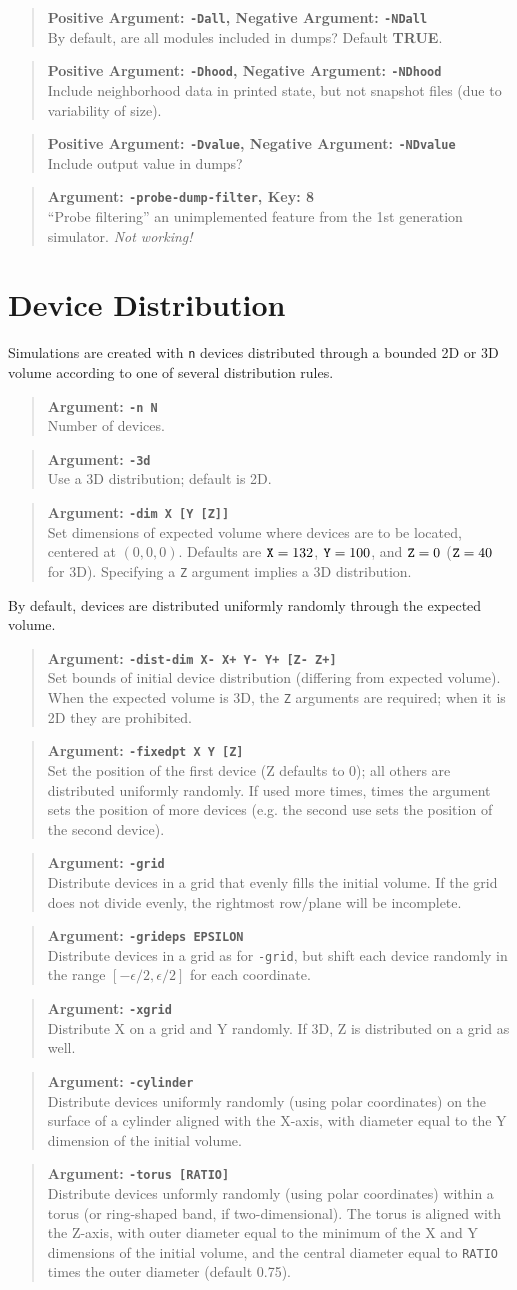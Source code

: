 \documentclass{article}
\newcommand\broken{{\em Not working!}}
\newcommand\true{{\bf TRUE}}
\newcommand\var[1]{{\tt #1}}
\newcommand\key[1]{{\bf #1}}
\newcommand\simarg[2]{\begin{quote} {\bf Argument: \var{#1}} \\ #2 \end{quote}}
\newcommand\simargkey[3]{
  \begin{quote} {\bf Argument: \var{#1}, Key: \key{#2}} \\ #3 \end{quote}
}
\newcommand\simPMarg[3]{
  \begin{quote}
    {\bf Positive Argument: \var{#1}, Negative Argument: \var{#2}} \\ #3
  \end{quote}
}
\begin{document}
\simPMarg{-Dall}{-NDall}{By default, are all modules included in dumps?
  Default \true{}.}
\simPMarg{-Dhood}{-NDhood}{Include neighborhood data in printed state, 
  but not snapshot files (due to variability of size).}
\simPMarg{-Dvalue}{-NDvalue}{Include output value in dumps?}

\simargkey{-probe-dump-filter}{8}{``Probe filtering'' an unimplemented feature
  from the 1st generation simulator. \broken{}}


\section{Device Distribution}

Simulations are created with \var{n} devices distributed through a
bounded 2D or 3D volume according to one of several distribution
rules.

\simarg{-n N}{Number of devices.}  \simarg{-3d}{Use a 3D distribution;
  default is 2D.}  \simarg{-dim X [Y [Z]]}{Set dimensions of expected
  volume where devices are to be located, centered at $(0,0,0)$.
  Defaults are $\var{X}=132$, $\var{Y}=100$, and $\var{Z}=0$
  ($\var{Z}=40$ for 3D).  Specifying a \var{Z} argument implies a 3D
  distribution.}

By default, devices are distributed uniformly randomly through the
expected volume.

\simarg{-dist-dim X- X+ Y- Y+ [Z- Z+]}{Set bounds of initial device
  distribution (differing from expected volume).  When the expected
  volume is 3D, the \var{Z} arguments are required; when it is 2D they
  are prohibited.}

\simarg{-fixedpt X Y [Z]}{Set the position of the first device (Z
  defaults to 0); all others are distributed uniformly randomly.  If
  used more times, times the argument sets the position of more
  devices (e.g. the second use sets the position of the second
  device).}
\simarg{-grid}{Distribute devices in a grid that evenly fills the
  initial volume.  If the grid does not divide evenly, the rightmost
  row/plane will be incomplete.}
\simarg{-grideps EPSILON}{Distribute devices in a grid as for
  \var{-grid}, but shift each device randomly in the range
  $[-\epsilon/2,\epsilon/2]$ for each coordinate.}
\simarg{-xgrid}{Distribute X on a grid and Y randomly.  If 3D, Z is
  distributed on a grid as well.}
\simarg{-cylinder}{Distribute devices uniformly randomly (using polar
  coordinates) on the surface of a cylinder aligned with the X-axis,
  with diameter equal to the Y dimension of the initial volume.}
\simarg{-torus [RATIO]}{Distribute devices unformly randomly (using
  polar coordinates) within a torus (or ring-shaped band, if
  two-dimensional).  The torus is aligned with the Z-axis, with outer
  diameter equal to the minimum of the X and Y dimensions of the
  initial volume, and the central diameter equal to \var{RATIO} times the
  outer diameter (default 0.75).}
\end{document}
